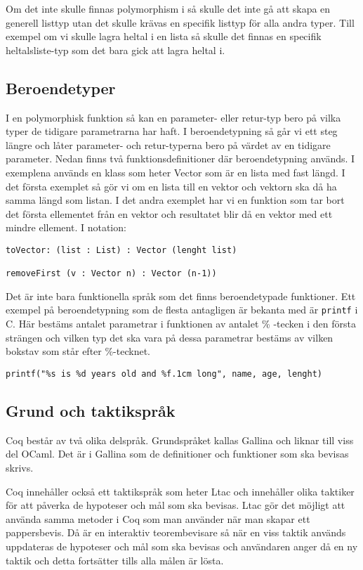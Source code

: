 Om det inte skulle finnas polymorphism i \coq så skulle det inte
gå att skapa en generell listtyp utan det skulle krävas en specifik
listtyp för alla andra typer. Till exempel om vi skulle lagra heltal
i en lista så skulle det finnas en specifik heltalsliste-typ som det bara
gick att lagra heltal i.

\subsection{Beroendetyper}
I en polymorphisk funktion så kan en parameter- eller retur-typ bero på vilka
typer de tidigare parametrarna har haft. I beroendetypning så går vi ett steg
längre och låter parameter- och retur-typerna bero på värdet av en
tidigare parameter.
Nedan finns två funktionsdefinitioner där beroendetypning används.
I exemplena används en klass som heter Vector som är en lista med fast längd. I
det första exemplet så gör vi om en lista till en vektor och vektorn ska då ha
samma längd som listan. I det andra exemplet har vi en funktion som tar bort
det första ellementet från en vektor och resultatet blir då en vektor med ett
mindre ellement. I \coq notation:
\begin{verbatim}
toVector: (list : List) : Vector (lenght list)

removeFirst (v : Vector n) : Vector (n-1))
\end{verbatim}

Det är inte bara funktionella språk som det finns beroendetypade funktioner.
Ett exempel på beroendetypning som de flesta antagligen är bekanta med är
\texttt{printf} i C. Här bestäms antalet parametrar i funktionen av antalet
\% -tecken i den första strängen och vilken typ det ska vara på dessa
parametrar bestäms av vilken bokstav som står efter \%-tecknet.
\begin{verbatim}
printf("%s is %d years old and %f.1cm long", name, age, lenght)
\end{verbatim}


\subsection{Grund och taktikspråk}
Coq består av två olika delspråk. Grundspråket kallas Gallina och liknar till
viss del OCaml. Det är i Gallina som de definitioner och funktioner som ska
bevisas skrivs.

Coq innehåller också ett taktikspråk som heter Ltac och innehåller olika
taktiker för att påverka de hypoteser och mål som ska bevisas. Ltac gör det
möjligt att använda samma metoder i Coq som man använder när man skapar ett
pappersbevis. Då \coq är en interaktiv teorembevisare så när en viss taktik
används uppdateras de hypoteser och mål som ska bevisas och användaren
anger då en ny taktik och detta fortsätter tills alla målen är lösta.
